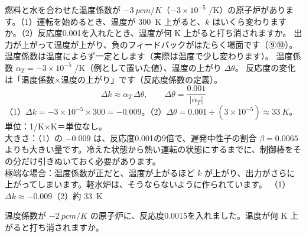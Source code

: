 \label{ph:原-15:ex10}
\begin{phreidai}[温度が上がると反応度が下がる]
燃料と水を合わせた温度係数が $-\qty{3}{pcm/K}$（$-3\times10^{-5}$ /K）の原子炉があります。（1）運転を始めるとき、温度が \qty{300}{K} 上がると、$k$ はいくら変わりますか。（2）反応度0.001を入れたとき、温度が何 K 上がると打ち消されますか。
\phbamen
出力が上がって温度が上がり、負のフィードバックがはたらく場面です（⑨⑩）。
\phmushi
温度係数は温度によらず一定とします（実際は温度で少し変わります）。
\phzu
温度係数 $\alpha_T=-3\times10^{-5}$ /K（例として置いた値）、温度の上がり $\Delta\theta$。
\phriyu
反応度の変化は「温度係数×温度の上がり」です（反応度係数の定義）。
\phtateru
\[ \Delta k\approx\alpha_T\,\Delta\theta,\qquad \Delta\theta=\frac{0.001}{|\alpha_T|} \]
\phtoku
（1）$\Delta k=-3\times10^{-5}\times300=-0.009$。（2）$\Delta\theta=0.001\div(3\times10^{-5})\approx\qty{33}{K}$。
\phtashikame
単位：1/K×K＝単位なし。\\
大きさ：（1）の $-0.009$ は、反応度0.001の9倍で、遅発中性子の割合 $\beta=0.0065$ よりも大きい量です。冷えた状態から熱い運転の状態にするまでに、制御棒をその分だけ引きぬいておく必要があります。\\
極端な場合：温度係数が正だと、温度が上がるほど $k$ が上がり、出力がさらに上がってしまいます。軽水炉は、そうならないように作られています。
\kotae （1）$\Delta k\approx-0.009$（2）約 \qty{33}{K}
\end{phreidai}
\begin{jibun}
温度係数が $-\qty{2}{pcm/K}$ の原子炉に、反応度0.0015を入れました。温度が何 K 上がると打ち消されますか。
\end{jibun}

